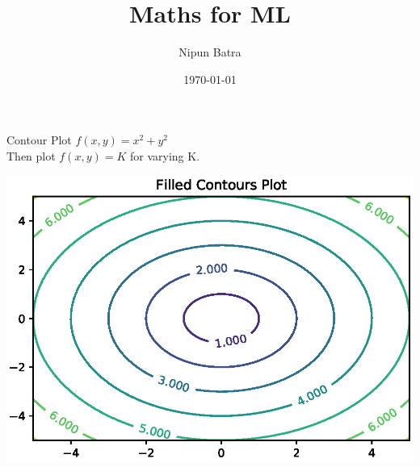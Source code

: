 \documentclass{beamer}
\title{Maths for ML}
\date{\today}
\author{Nipun Batra}
\institute{IIT Gandhinagar}
\begin{document}
  \maketitle
  
  
  

\begin{frame}{Contour Plot}
 $f(x,y) = x^{2} + y^{2}$\\
 Then plot $f(x,y)=K$ for varying K.
 \begin{center}
     \includegraphics[totalheight=6cm]{ml-maths/contour-plot-1.eps}
 \end{center}
 
\end{frame}
\end{document}
